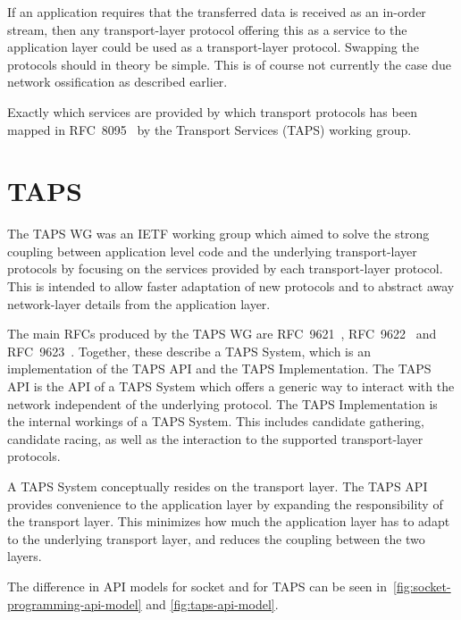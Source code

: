 If an application requires that the
transferred data is received as an in-order stream, then
any transport-layer protocol offering this as a service to the application layer
could be used as a transport-layer protocol. Swapping the
protocols should in theory be simple. This is of course
not currently the case due network ossification as described
earlier.

Exactly which services are provided by which transport
protocols has been mapped in RFC~8095~\cite{rfc8095} by the Transport Services (TAPS) working group.

\section{TAPS}
The TAPS WG was an IETF working group which aimed to solve the strong
coupling between application
level code and the underlying transport-layer protocols by
focusing on the services provided by each transport-layer protocol.
This is intended to allow faster adaptation of new protocols and to
abstract away network-layer details from the application layer.

The main RFCs produced by the TAPS WG are RFC~9621~\cite{rfc9621},
RFC~9622~\cite{rfc9622} and RFC~9623~\cite{rfc9623}. Together, these
describe a TAPS System, which is an implementation of the TAPS
API and the TAPS Implementation. The TAPS API is the API of a
TAPS System which offers a generic way to interact with the network
independent of the underlying protocol. The TAPS Implementation 
is the internal workings of a TAPS System. This includes candidate
gathering, candidate racing, as well as the interaction
to the supported transport-layer protocols.

A TAPS System conceptually resides
on the transport layer. The TAPS API provides convenience to the application
layer by expanding the responsibility of the transport layer.
This minimizes how much the application layer has to adapt to
the underlying transport layer, and reduces the coupling between the two layers.

The difference in API models for socket and for TAPS can be
seen in~\cref{fig:socket-programming-api-model} and
\cref{fig:taps-api-model}.

